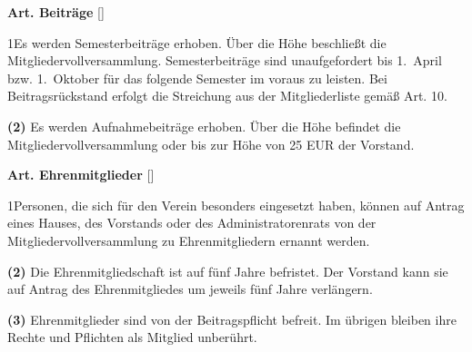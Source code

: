 \documentclass[12pt]{article}
\newcommand{\Satz}[2]{

\begin{samepage}
{\bf (#1)} #2
\end{samepage}
}
\newenvironment{Artikel}[2]{
\bigskip \centerline{{\bf Art. #1} [#2]}
\nopagebreak
}{
}
\begin{document}

\begin{Artikel}{8}{Beiträge}

\Satz{1}{Es werden Semesterbeiträge erhoben. Über die Höhe beschließt die
Mitgliedervollversammlung. Semesterbeiträge sind unaufgefordert bis \mbox{1.
April} bzw. \mbox{1. Oktober} für das folgende Semester im voraus zu leisten.
Bei Beitragsrückstand erfolgt die Streichung aus der Mitgliederliste gemäß Art.
10.}

\Satz{2}{Es werden Aufnahmebeiträge erhoben. Über die Höhe befindet die
Mitgliedervollversammlung oder bis zur Höhe von 25 EUR der Vorstand.}

\end{Artikel}

\begin{Artikel}{9}{Ehrenmitglieder}

\Satz{1}{Personen, die sich für den Verein besonders eingesetzt haben, können
auf Antrag eines Hauses, des Vorstands oder des Administratorenrats von der
Mitgliedervollversammlung zu Ehrenmitgliedern ernannt werden.}

\Satz{2}{Die Ehrenmitgliedschaft ist auf fünf Jahre befristet. Der Vorstand
kann sie auf Antrag des Ehrenmitgliedes um jeweils fünf Jahre verlängern.}

\Satz{3}{Ehrenmitglieder sind von der Beitragspflicht befreit. Im übrigen
bleiben ihre Rechte und Pflichten als Mitglied unberührt.}

\end{Artikel}
\end{document}
